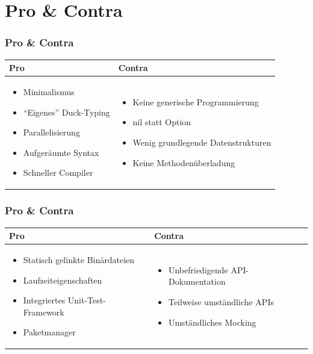 \documentclass{beamer}
\begin{document}

\section{Pro \& Contra}
\begin{frame}
\frametitle{Pro \& Contra}

\begin{tabular}{p{5cm} | p{5.5cm}}
\textbf{Pro} & \textbf{Contra} \\ \hline
\begin{itemize}
\setlength{\itemsep}{20pt}
\item Minimalismus
\item ``Eigenes'' Duck-Typing
\item Parallelisierung
\item Aufger\"aumte Syntax
\item Schneller Compiler
\end{itemize}
&
\begin{itemize}
\setlength{\itemsep}{20pt}
\item Keine generische Programmierung
\item nil statt Option
\item Wenig grundlegende Datenstrukturen
\item Keine Methodenüberladung
\end{itemize}
\\
\end{tabular}

\end{frame}

\begin{frame}
\frametitle{Pro \& Contra}

\begin{tabular}{p{5cm} | p{5.5cm}}
\textbf{Pro} & \textbf{Contra} \\ \hline
\begin{itemize}
\setlength{\itemsep}{20pt}
\item Statisch gelinkte Binärdateien
\item Laufzeiteigenschaften
\item Integriertes Unit-Test-Framework
\item Paketmanager
\end{itemize}
&
\begin{itemize}
\setlength{\itemsep}{20pt}
\item Unbefriedigende API-Dokumentation
\item Teilweise umständliche APIs
\item Umst\"andliches Mocking
\end{itemize}
\\
\end{tabular}

\end{frame}
\end{document}
